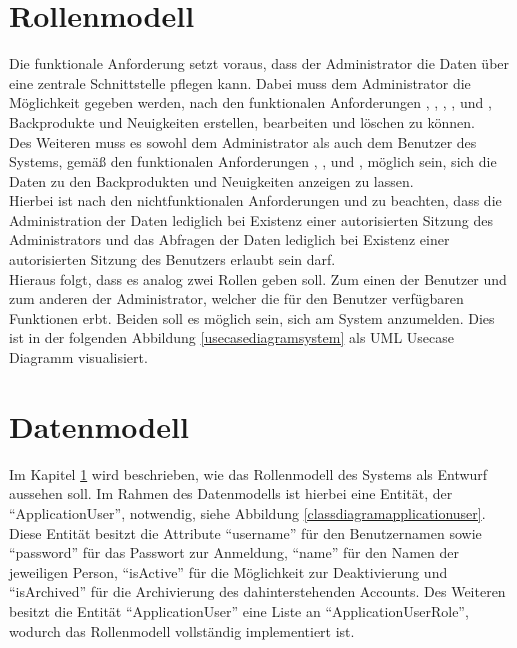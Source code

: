 \section{Rollenmodell} \label{rollenmodell}
Die funktionale Anforderung  setzt voraus, dass der Administrator die Daten über eine zentrale Schnittstelle pflegen kann. Dabei muss dem Administrator die Möglichkeit gegeben werden, nach den funktionalen Anforderungen , , , ,  und , Backprodukte und Neuigkeiten erstellen, bearbeiten und löschen zu können.
\\
Des Weiteren muss es sowohl dem Administrator als auch dem Benutzer des Systems, gemäß den funktionalen Anforderungen , ,  und , möglich sein, sich die Daten zu den Backprodukten und Neuigkeiten anzeigen zu lassen. 
\\
Hierbei ist nach den nichtfunktionalen Anforderungen  und  zu beachten, dass die Administration der Daten lediglich bei Existenz einer autorisierten Sitzung des Administrators und das Abfragen der Daten lediglich bei Existenz einer autorisierten Sitzung des Benutzers erlaubt sein darf.
\\
Hieraus folgt, dass es analog zwei Rollen geben soll. Zum einen der Benutzer und zum anderen der Administrator, welcher die für den Benutzer verfügbaren Funktionen erbt. Beiden soll es möglich sein, sich am System anzumelden.
Dies ist in der folgenden Abbildung \ref{usecasediagramsystem} als UML Usecase Diagramm visualisiert.


\clearpage

\section{Datenmodell} \label{datenmodell}
Im Kapitel \ref{rollenmodell} wird beschrieben, wie das Rollenmodell des Systems als Entwurf aussehen soll.
Im Rahmen des Datenmodells ist hierbei eine Entität, der \enquote{ApplicationUser}, notwendig, siehe Abbildung \ref{classdiagramapplicationuser}. Diese Entität besitzt die Attribute \enquote{username} für den Benutzernamen sowie \enquote{password} für das Passwort zur Anmeldung, \enquote{name} für den Namen der jeweiligen Person, \enquote{isActive} für die Möglichkeit zur Deaktivierung und \enquote{isArchived} für die Archivierung des dahinterstehenden Accounts. Des Weiteren besitzt die Entität \mbox{\enquote{ApplicationUser}} eine Liste an \enquote{ApplicationUserRole}, wodurch das Rollenmodell vollständig implementiert ist.

